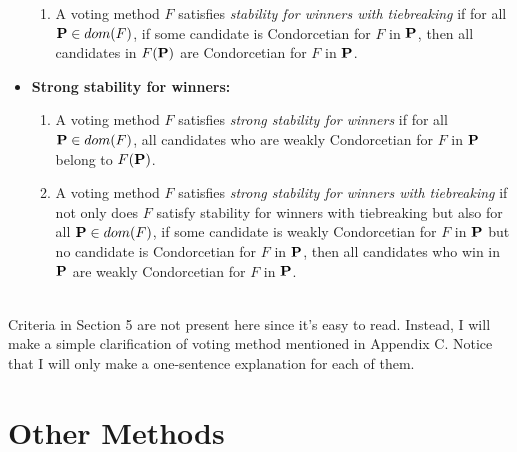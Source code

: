 \begin{definition}
\begin{itemize}
\begin{enumerate}
            \item A voting method $F$ satisfies \emph{stability for winners with tiebreaking} if for all $\mathbf{P} \in dom(F)$, if some candidate is Condorcetian for $F$ in $\mathbf{P}$, then all candidates in $F (\mathbf{P})$ are Condorcetian for $F$ in $\mathbf{P}$.
        \end{enumerate}
        \item \textbf{Strong stability for winners:}
        \begin{enumerate}
            \item A voting method $F$ satisfies \emph{strong stability for winners} if for all $\mathbf{P} \in dom(F)$, all candidates who are weakly Condorcetian for $F$ in $\mathbf{P}$ belong to $F(\mathbf{P})$.
            \item A voting method $F$ satisfies \emph{strong stability for winners with tiebreaking} if not only does $F$ satisfy stability for winners with tiebreaking but also for all $\mathbf{P} \in dom(F)$, if some candidate is weakly Condorcetian for $F$ in $\mathbf{P}$ but no candidate is Condorcetian for $F$ in $\mathbf{P}$, then all candidates who win in $\mathbf{P}$ are weakly Condorcetian for $F$ in $\mathbf{P}$.
        \end{enumerate}
    \end{itemize}
\end{definition}
~\\
Criteria in Section 5 are not present here since it's easy to read. Instead, I will make a simple clarification of voting method mentioned in Appendix C. Notice that I will only make a one-sentence explanation for each of them.

\section{Other Methods}

